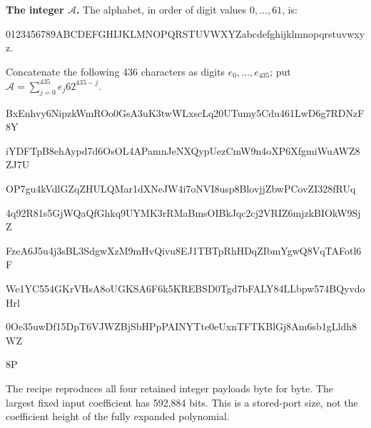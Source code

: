 \textbf{The integer $\mathcal A$.}
The alphabet, in order of digit values $0,\ldots,61$, is:\par
{\fontsize{7.7}{8.2}\selectfont\ttfamily 0123456789ABCDEFGHIJKLMNOPQRSTUVWXYZabcdefghijklmnopqrstuvwxyz}.\par
Concatenate the following 436 characters as digits $e_0,\ldots,e_{435}$;
put $\mathcal A=\sum_{j=0}^{435}e_j62^{435-j}$.\par
\begingroup\fontsize{7.7}{8.2}\selectfont\ttfamily
BxEnhvy6NipzkWmROo0GsA3uK3twWLxscLq20UTumy5Cdu461LwD6g7RDNzF8Y\par
iYDFTpB8ehAypd7d6OsOL4APamnJeNXQypUezCmW9n4oXP6XfgmiWuAWZ8ZJ7U\par
OP7gu4kVdlGZqZHULQMar1dXNeJW4i7oNVI8usp8BlovjjZbwPCovZI328fRUq\par
4q92R81s5GjWQaQfGhkq9UYMK3rRMaBmsOIBkJqc2cj2VRIZ6mjzkBIOkW9SjZ\par
FzeA6J5u4j3sBL3SdgwXzM9mHvQivu8EJ1TBTpRhHDqZIbmYgwQ8VqTAFotl6F\par
We1YC554GKrVHsA8oUGKSA6F6k5KREBSD0Tgd7bFALY84LLbpw574BQyvdoHrl\par
0Oe35uwDf15DpT6VJWZBjSbHPpPAINYTte0eUxnTFTKBlGj8Am6sb1gLldh8WZ\par
8P\par
\endgroup
\endgroup

The recipe reproduces all four retained integer payloads byte for byte. The
largest fixed input coefficient has 592,884 bits. This is a stored-port
size, not the coefficient height of the fully expanded polynomial.

